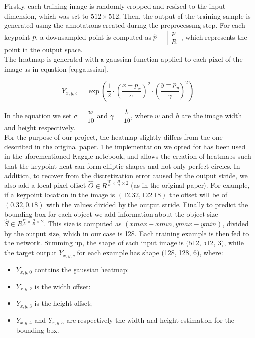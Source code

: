 \label{ssssec:inputsamples}

Firstly, each training image is randomly cropped and resized to the input dimension, which was set to $512 \times 512$. Then, the output of the training sample is generated using the annotations created during the preprocessing step. For each keypoint $p$, a downsampled point is computed as $\hat{p}=\left\lfloor \dfrac{p}{R} \right\rfloor$, which represents the point in the output space.\\
The heatmap is generated with a gaussian function applied to each pixel of the image as in equation \ref{eq:gaussian}.

\begin{equation}\label{eq:gaussian}
	Y_{x,y,c}=\exp\left(\dfrac{1}{2} \cdot \left(\frac{x-p_x}{\sigma}\right)^2 \cdot \left(\frac{y-p_y}{\gamma}\right)^2 \right)
\end{equation}

In the equation we set $\sigma = \dfrac{w}{10}$ and $\gamma = \dfrac{h}{10}$, where $w$ and $h$ are the image width and height respectively.\\
For the purpose of our project, the heatmap slightly differs from the one described in the original paper. The implementation we opted for has been used in the aforementioned Kaggle notebook, and allows the creation of heatmaps such that the keypoint heat can form elliptic shapes and not only perfect circles. In addition, to recover from the discretization error caused by the output stride, we also add a local pixel offset $\widehat{O} \in R^{\frac{W}{R} \times \frac{H}{R} \times 2}$ (as in the original paper). For example, if a keypoint location in the image is $(12.32, 122.18)$ the offset will be of $(0.32, 0.18)$ with the values divided by the output stride.
Finally to predict the bounding box for each object we add information about the object size $\widehat{S} \in R^{\frac{W}{R} \times \frac{H}{R} \times 2}$. This size is computed as $(xmax-xmin, ymax-ymin)$, divided by the output size, which in our case is 128. Each training example is then fed to the network. Summing up, the shape of each input image is (512, 512, 3), while the target output $Y_{x,y,c}$ for each example has shape (128, 128, 6), where:

\begin{itemize}
	\item $Y_{x,y,0}$ contains the gaussian heatmap;
	\item $Y_{x,y,2}$ is the width offset;
	\item $Y_{x,y,3}$ is the height offset;
	\item $Y_{x,y,4}$ and $Y_{x,y,5}$ are respectively the width and height estimation for the bounding box.
\end{itemize}


